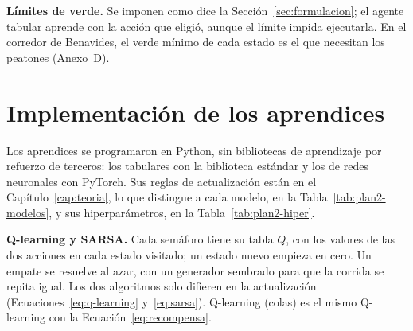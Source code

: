 \noindent\textbf{Límites de verde.} Se imponen como dice la
Sección~\ref{sec:formulacion}; el agente tabular aprende con la acción
que eligió, aunque el límite impida ejecutarla. En el corredor de
Benavides, el verde mínimo de cada estado es el que necesitan los
peatones (Anexo~D).


\section{Implementación de los aprendices}
\label{sec:aprendices}

Los aprendices se programaron en Python, sin bibliotecas de aprendizaje
por refuerzo de terceros: los tabulares con la biblioteca estándar y
los de redes neuronales con PyTorch. Sus reglas de actualización están
en el Capítulo~\ref{cap:teoria}, lo que distingue a cada modelo, en la
Tabla~\ref{tab:plan2-modelos}, y sus hiperparámetros, en la
Tabla~\ref{tab:plan2-hiper}.

\noindent\textbf{Q-learning y SARSA.} Cada semáforo tiene su tabla
$Q$, con los valores de las dos acciones en cada estado visitado; un
estado nuevo empieza en cero. Un empate se resuelve al azar, con un
generador sembrado para que la corrida se repita igual. Los dos
algoritmos solo difieren en la actualización
(Ecuaciones~\ref{eq:q-learning} y~\ref{eq:sarsa}). Q-learning (colas)
es el mismo Q-learning con la Ecuación~\ref{eq:recompensa}.

